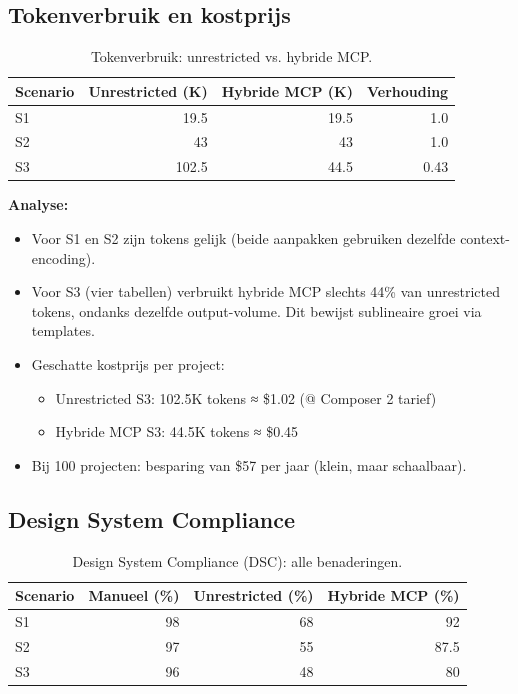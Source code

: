 \subsection{Tokenverbruik en kostprijs}

\begin{table}[h]
\small
\begin{tabularx}{\textwidth}{|l|r|r|r|}
\hline
\textbf{Scenario} & \textbf{Unrestricted (K)} & \textbf{Hybride MCP (K)} & \textbf{Verhouding} \\
\hline
S1 & 19.5 & 19.5 & 1.0 \\
S2 & 43 & 43 & 1.0 \\
S3 & 102.5 & 44.5 & 0.43 \\
\hline
\end{tabularx}
\caption{Tokenverbruik: unrestricted vs. hybride MCP.}
\label{tab:token-comparison}
\end{table}

\noindent
\textbf{Analyse:}
\begin{itemize}
  \item Voor S1 en S2 zijn tokens gelijk (beide aanpakken gebruiken dezelfde context-encoding).
  \item Voor S3 (vier tabellen) verbruikt hybride MCP slechts 44\% van unrestricted tokens, ondanks dezelfde output-volume. Dit bewijst sublineaire groei via templates.
  \item Geschatte kostprijs per project:
    \begin{itemize}
      \item Unrestricted S3: 102.5K tokens ≈ \$1.02 (@ Composer 2 tarief)
      \item Hybride MCP S3: 44.5K tokens ≈ \$0.45
    \end{itemize}
  \item Bij 100 projecten: besparing van \$57 per jaar (klein, maar schaalbaar).
\end{itemize}

\subsection{Design System Compliance}

\begin{table}[h]
\small
\begin{tabularx}{\textwidth}{|l|r|r|r|}
\hline
\textbf{Scenario} & \textbf{Manueel (\%)} & \textbf{Unrestricted (\%)} & \textbf{Hybride MCP (\%)} \\
\hline
S1 & 98 & 68 & 92 \\
S2 & 97 & 55 & 87.5 \\
S3 & 96 & 48 & 80 \\
\hline
\end{tabularx}
\caption{Design System Compliance (DSC): alle benaderingen.}
\label{tab:dsc-comparison}
\end{table}

